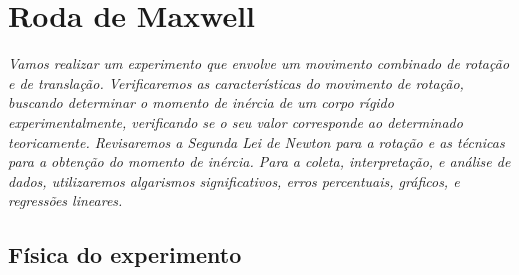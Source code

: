 \chapter{Roda de Maxwell} %
\label{Chap:RodaDeMaxwell}        %


\begin{fullwidth}\it
	Vamos realizar um experimento que envolve um movimento combinado de rotação e de translação. Verificaremos as características do movimento de rotação, buscando determinar o momento de inércia de um corpo rígido experimentalmente, verificando se o seu valor corresponde ao determinado teoricamente. Revisaremos a Segunda Lei de Newton para a rotação e as técnicas para a obtenção do momento de inércia. Para a coleta, interpretação, e análise de dados, utilizaremos algarismos significativos, erros percentuais, gráficos, e regressões lineares.
\end{fullwidth}

\section{Física do experimento}

